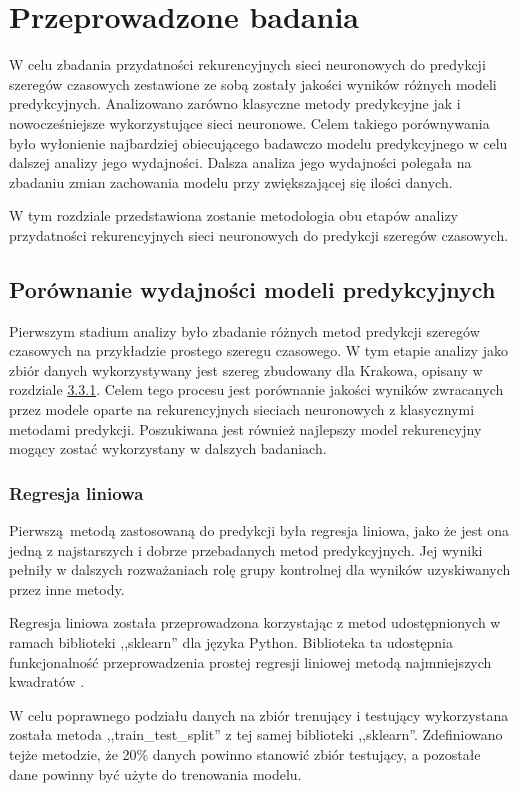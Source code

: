 \documentclass[10pt,a4paper]{article}
\begin{document}
\section{Przeprowadzone badania}
W celu zbadania przydatności rekurencyjnych sieci neuronowych do predykcji szeregów czasowych zestawione ze sobą zostały jakości wyników różnych modeli predykcyjnych. Analizowano zarówno klasyczne metody predykcyjne jak i nowocześniejsze wykorzystujące sieci neuronowe. Celem takiego porównywania było wyłonienie najbardziej obiecującego badawczo modelu predykcyjnego w celu dalszej analizy jego wydajności. Dalsza analiza jego wydajności polegała na zbadaniu zmian zachowania modelu przy zwiększającej się ilości danych. 

W tym rozdziale przedstawiona zostanie metodologia obu etapów analizy przydatności rekurencyjnych sieci neuronowych do predykcji szeregów czasowych. 
\subsection{Porównanie wydajności modeli predykcyjnych}
Pierwszym stadium analizy było zbadanie różnych metod predykcji szeregów czasowych na przykładzie prostego szeregu czasowego. W tym etapie analizy jako zbiór danych wykorzystywany jest szereg zbudowany dla Krakowa, opisany w rozdziale \hyperlink{subsubsection.3.3.1}{3.3.1}. Celem tego procesu jest porównanie jakości wyników zwracanych przez modele oparte na rekurencyjnych sieciach neuronowych z klasycznymi metodami predykcji. Poszukiwana jest również najlepszy model rekurencyjny mogący zostać wykorzystany w dalszych badaniach. 

\subsubsection{Regresja liniowa}
Pierwszą metodą zastosowaną do predykcji była regresja liniowa, jako że jest ona jedną z najstarszych i dobrze przebadanych metod predykcyjnych. Jej wyniki pełniły w dalszych rozważaniach rolę grupy kontrolnej dla wyników uzyskiwanych przez inne metody.

Regresja liniowa została przeprowadzona korzystając z metod udostępnionych w ramach biblioteki ,,sklearn'' dla języka Python. Biblioteka ta udostępnia funkcjonalność przeprowadzenia prostej regresji liniowej metodą najmniejszych kwadratów \cite{sklearnLinearRegression}.

W celu poprawnego podziału danych na zbiór trenujący i testujący wykorzystana została metoda ,,train\_test\_split'' z tej samej biblioteki ,,sklearn''. Zdefiniowano tejże metodzie, że 20\% danych powinno stanowić zbiór testujący, a pozostałe dane powinny być użyte do trenowania modelu. 
\end{document}
